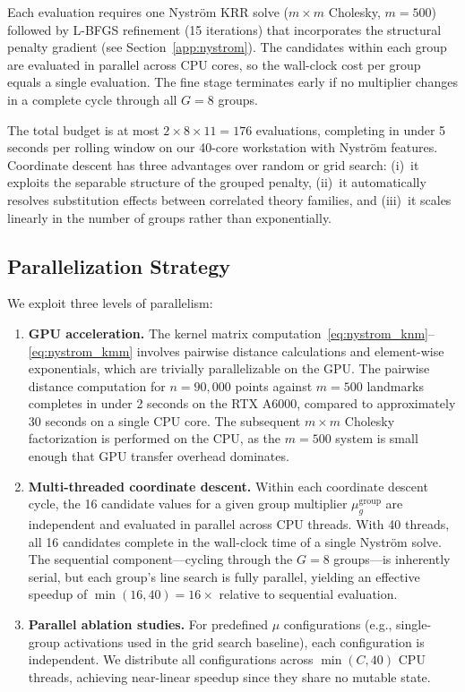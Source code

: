 Each evaluation requires one Nystr\"{o}m KRR solve ($m \times m$ Cholesky, $m = 500$) followed by L-BFGS refinement (15 iterations) that incorporates the structural penalty gradient (see Section~\ref{app:nystrom}).
The candidates within each group are evaluated in parallel across CPU cores, so the wall-clock cost per group equals a single evaluation.
The fine stage terminates early if no multiplier changes in a complete cycle through all $G = 8$ groups.

The total budget is at most $2 \times 8 \times 11 = 176$ evaluations, completing in under 5 seconds per rolling window on our 40-core workstation with Nystr\"{o}m features.
Coordinate descent has three advantages over random or grid search: (i)~it exploits the separable structure of the grouped penalty, (ii)~it automatically resolves substitution effects between correlated theory families, and (iii)~it scales linearly in the number of groups rather than exponentially.

\subsection{Parallelization Strategy}
\label{app:parallel}

We exploit three levels of parallelism:

\begin{enumerate}
\item \textbf{GPU acceleration.}
The kernel matrix computation~\eqref{eq:nystrom_knm}--\eqref{eq:nystrom_kmm} involves pairwise distance calculations and element-wise exponentials, which are trivially parallelizable on the GPU.
The pairwise distance computation for $n = 90{,}000$ points against $m = 500$ landmarks completes in under 2 seconds on the RTX A6000, compared to approximately 30 seconds on a single CPU core.
The subsequent $m \times m$ Cholesky factorization is performed on the CPU, as the $m = 500$ system is small enough that GPU transfer overhead dominates.

\item \textbf{Multi-threaded coordinate descent.}
Within each coordinate descent cycle, the 16 candidate values for a given group multiplier $\mu_g^{\mathrm{group}}$ are independent and evaluated in parallel across CPU threads.
With 40 threads, all 16 candidates complete in the wall-clock time of a single Nystr\"{o}m solve.
The sequential component---cycling through the $G = 8$ groups---is inherently serial, but each group's line search is fully parallel, yielding an effective speedup of $\min(16, 40) = 16\times$ relative to sequential evaluation.

\item \textbf{Parallel ablation studies.}
For predefined $\mu$ configurations (e.g., single-group activations used in the grid search baseline), each configuration is independent.
We distribute all configurations across $\min(C, 40)$ CPU threads, achieving near-linear speedup since they share no mutable state.
\end{enumerate}

